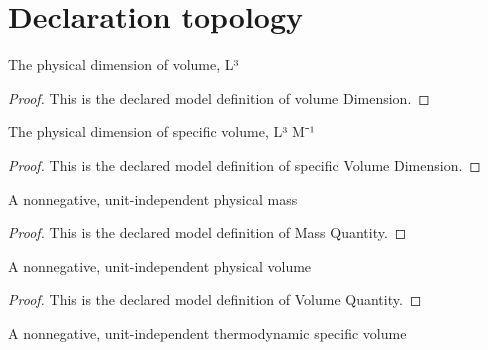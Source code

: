\section{Declaration topology}
\begin{definition}
  \label{def:physics:phyx-mini-0450:phyxminiproblems-problemphyxmini0450-volumedimension}
  The physical dimension of volume, L³
\end{definition}
\begin{proof}
  This is the declared model definition of volume Dimension.
\end{proof}
\begin{definition}
  \label{def:physics:phyx-mini-0450:phyxminiproblems-problemphyxmini0450-specificvolumedimension}
  The physical dimension of specific volume, L³ M⁻¹
\end{definition}
\begin{proof}
  This is the declared model definition of specific Volume Dimension.
\end{proof}
\begin{definition}
  \label{def:physics:phyx-mini-0450:phyxminiproblems-problemphyxmini0450-massquantity}
  A nonnegative, unit-independent physical mass
\end{definition}
\begin{proof}
  This is the declared model definition of Mass Quantity.
\end{proof}
\begin{definition}
  \label{def:physics:phyx-mini-0450:phyxminiproblems-problemphyxmini0450-volumequantity}
  A nonnegative, unit-independent physical volume
\end{definition}
\begin{proof}
  This is the declared model definition of Volume Quantity.
\end{proof}
\begin{definition}
  \label{def:physics:phyx-mini-0450:phyxminiproblems-problemphyxmini0450-specificvolumequantity}
  A nonnegative, unit-independent thermodynamic specific volume
\end{definition}
